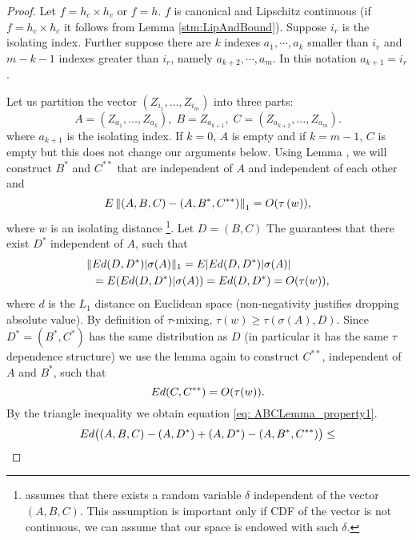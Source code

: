 \begin{proof}
Let $f = h_c \times h_c$ or $f=h$. $f$ is canonical and Lipschitz continuous (if $f = h_c \times h_c$ it follows from  Lemma \ref{stm:LipAndBound}).   Suppose $i_r$ is  the isolating index. Further suppose there are $k$  indexes $a_1,\cdots ,a_k$ smaller than $i_r$ and $m-k-1$ indexes greater than $i_r$, namely $a_{k+2}, \cdots , a_m$. In this  notation $a_{k+1}=i_r$.   

Let us partition the vector $\left(Z_{i_{1}},\ldots,Z_{i_{m}}\right)$ into three parts:
\begin{equation*}
A =  \left(Z_{a_{1}},\ldots,Z_{a_{k}}\right),\; B=Z_{a_{k+1}},\; C=\left(Z_{a_{k+2}},\ldots,Z_{a_{m}}\right).
\end{equation*}
where $a_{k+1}$ is the isolating index. If $k=0$, $A$ is empty and if $k=m-1$, $C$ is empty but this does not change our arguments below. Using
Lemma \cite[Lemma 5.3]{dedecker2007weak}, we will construct $B^{*}$ and $C^{**}$ that are independent
of $A$ and independent of each other and 
\begin{equation}
E \left\Vert \left(A,B,C\right)-\left(A,B^{*},C^{**}\right)\right\Vert _{1} =  O(\tau\left(w\right)), \label{eq: ABCLemma_property1}
\end{equation}
where $w$ is an isolating distance \footnote{ \cite[Lemma 5.3]{dedecker2007weak}   assumes that there exists a random variable $\delta$ independent of the vector $(A,B,C)$. This assumption is important only if CDF of the vector is not continuous, we can assume that our space is endowed with such $\delta$.}.  Let $D=(B,C)$ The \cite[Lemma 5.3]{dedecker2007weak}  guarantees that there exist $D^*$ independent of $A$, such that 
\begin{align*}
 \|& E d(D,D^*) | \sigma(A) \|_1 = E |  E d(D,D^*) | \sigma(A) | \\
 &= E   (E d(D,D^*) | \sigma(A)) = E d(D,D^*) = O(\tau(w)),
\end{align*}
where $d$ is the $L_1$ distance on Euclidean space (non-negativity justifies dropping absolute value). By definition of  $\tau$-mixing, $\tau(w) \geq \tau(\sigma(A),D )$. Since  $D^*=(B^*,C^*)$ has the same distribution as $D$ (in particular it has the same $\tau$ dependence structure) we use the lemma again to construct $C^{**}$, independent of $A$ and $B^*$, such that 
\[
  E d(C,C^{**}) =  O(\tau(w)).
\]
By the triangle inequality we obtain equation \ref{eq: ABCLemma_property1}. 
\begin{align*}
&\ev  d \big( (A,B,C) - (A,D^*) + (A,D^*) - (A,B^*,C^{**}) \big) \leq \\

\end{align*}
\end{proof}
